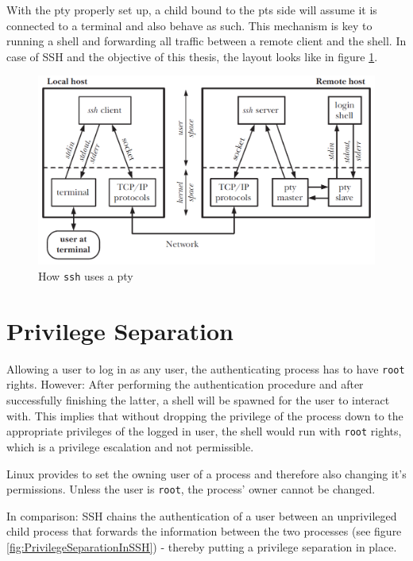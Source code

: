 \documentclass[10pt,a4paper,titlepage,twoside,english,final]{zhawreprt}
\begin{document}
With the \gls{pty} properly set up, a child bound to the \gls{pts} side will assume it is connected to a \gls{terminal} and also behave as such.
This mechanism is key to running a \gls{shell} and forwarding all traffic between a remote client and the \gls{shell}.
In case of \gls{SSH} and the objective of this thesis, the layout looks like in figure \ref{fig:HowSSHUsesPty}.
\begin{figure}[ht]
\includegraphics[width=\textwidth]{PseudoterminalSSH}
\caption{How \texttt{ssh} uses a \gls{pty}\citep[p.1378]{KerriskTLPI}}
\label{fig:HowSSHUsesPty}
\end{figure}


\newpage
\section{Privilege Separation}\label{sec:DesignPrivilegeSeparation}
Allowing a user to log in as any user, the authenticating process has to have \texttt{root} rights.
However: After performing the authentication procedure and after successfully finishing the latter, a \gls{shell} will be spawned for the user to interact with.
This implies that without dropping the privilege of the process down to the appropriate privileges of the logged in user, the \gls{shell} would run with \texttt{root} rights, which is a privilege escalation and not permissible.

\gls{Linux} provides \cite{setuid} to set the owning user of a process and therefore also changing it's permissions.
Unless the user is \texttt{root}, the process' owner cannot be changed.

In comparison: \gls{SSH} chains the authentication of a user between an unprivileged child process that forwards the information between the two processes (see figure \ref{fig:PrivilegeSeparationInSSH}) - thereby putting a privilege separation in place.
\end{document}

